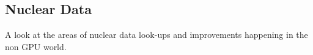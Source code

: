 \subsection{Nuclear Data}

A look at the areas of nuclear data look-ups and improvements happening in the non GPU world.